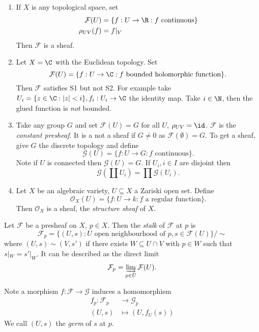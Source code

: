 \documentclass[a4paper]{article}
\newcommand{\sh}[1]{\mathcal{#1}} %
\begin{document}
\begin{eg}\leavevmode
  \begin{enumerate}
  \item If \(X\) is any topological space, set
    \begin{align*}
      \sh F(U) &= \{f: U \to \R: f \text{ continuous}\} \\
      \rho_{UV}(f) &= f|_V
    \end{align*}
    Then \(\sh F\) is a sheaf.
  \item Let \(X = \C\) with the Euclidean topology. Set
    \[
      \sh F(U) = \{f: U \to \C: f \text{ bounded holomorphic function}\}.
    \]
    Then \(\sh F\) satisfies S1 but not S2. For example take \(U_i = \{z \in \C: |z| < i\}, f_i: U_i \to \C\) the identity map. Take \(i \in \N\), then the glued function is \emph{not} bounded.
  \item Take any group \(G\) and set \(\sh F(U) = G\) for all \(U\), \(\rho_{UV} = \id\). \(\sh F\) is the \emph{constant presheaf}. It is a not a sheaf if \(G \neq 0\) as \(\sh F(\emptyset) = G\). To get a sheaf, give \(G\) the discrete topology and define
    \[
      \sh G(U) = \{f: U \to G: f \text{ continuous}\}.
    \]
    Note if \(U\) is connected then \(\sh G(U) = G\). If \(U_i, i \in I\) are disjoint then
    \[
      \sh G(\coprod U_i) = \prod \sh G(U_i).
    \]
  \item Let \(X\) be an algebraic variety, \(U \subseteq X\) a Zariski open set. Define
    \[
      \sh O_X(U) = \{f: U \to k: f \text{ a regular function}\}.
    \]
    Then \(\sh O_X\) is a sheaf, the \emph{structure sheaf} of \(X\).
  \end{enumerate}
\end{eg}

\begin{definition}[stalk]
  Let \(\sh F\) be a presheaf on \(X\), \(p \in X\). Then the \emph{stalk} of \(\sh F\) at \(p\) is
  \[
    \sh F_p = \{(U, s): U \text{ open neighbourhood of } p, s \in \sh F(U)\} / \sim
  \]
  where \((U, s) \sim (V, s')\) if there exists \(W \subseteq U \cap V\) with \(p \in W\) such that \(s|_W = s'|_W\). It can be described as the direct limit
  \[
    \sh F_p = \varinjlim_{p \in U} \sh F(U).
  \]
\end{definition}

Note a morphism \(f: \sh F \to \sh G\) induces a homomorphism
\begin{align*}
  f_p: \sh F_p &\to \sh G_p \\
  (U, s) &\mapsto (U, f_U(s))
\end{align*}
We call \((U, s)\) the \emph{germ} of \(s\) at \(p\).
\end{document}
